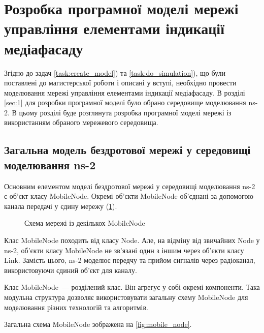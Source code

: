 \documentclass[a4paper,ukrainian,utf8,nocolumnsxix,floatsection,equationsection]{eskdtext}
\begin{document}



\section{Розробка програмної моделі мережі управління елементами індикації медіафасаду}
\label{sec:3:model:development}

Згідно до задач \ref{task:create_model}) та \ref{task:do_simulation}), що були поставлені до магистерської роботи і описані у вступі, необхідно провести моделювання мережі управління елементами індикації медіафасаду. В розділі \ref{sec:1} для розробки програмної моделі було обрано середовище моделювання ns-2. В цьому розділі буде розглянута розробка програмної моделі мережі із використанням обраного мережевого середовища.

\subsection{Загальна модель бездротової мережі у середовищі моделювання ns-2}
\label{sub:ns:general:network:model}

Основним елементом моделі бездротової мережі у середовищі моделювання ns-2 є об’єкт класу MobileNode. Окремі об’єкти MobileNode об’єднані за допомогою канала передачі у єдину мережу (\cref{fig:mobile_node:network}). 


\begin{figure}[bth]
	\centering
	\caption{\label{fig:mobile_node:network}Схема мережі із декількох MobileNode}
\end{figure}

Клас MobileNode походить від класу Node. Але, на відміну від звичайних Node у ns-2, об’єкти класу MobileNode не зв’язані один з іншим через об’єкти класу Link. Замість цього, ns-2 моделює передчу та прийом сигналів через радіоканал, використовуючи єдиний об’єкт для каналу.

Клас MobileNode~--- розділений клас. Він агрегує у собі окремі компоненти. Така модульна структура дозволяє використовувати загальну схему MobileNode для моделювання різних технологій та алгоритмів. 

Загальна схема MobileNode зображена на \cref{fig:mobile_node}.
\end{document}

